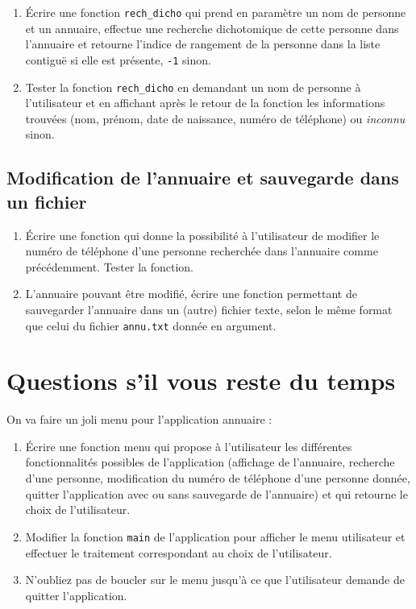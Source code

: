 \documentclass[final, pdftex, a4paper, openbib, ]{article}
\begin{document}
\begin{enumerate}
	\item Écrire une fonction \texttt{rech\_dicho} qui prend en paramètre un nom de personne et un annuaire, effectue une recherche dichotomique de cette personne dans l'annuaire
	et retourne l'indice de rangement de la personne dans la liste contiguë si elle est
	présente, \texttt{-1} sinon.
	\item Tester la fonction \texttt{rech\_dicho} en demandant un nom de personne à l'utilisateur et en affichant après le retour de la fonction les informations trouvées (nom, prénom, date de naissance, numéro de téléphone) ou \textit{inconnu} sinon.
\end{enumerate}

\subsection{Modification de l'annuaire et sauvegarde dans un fichier}

\begin{enumerate}
	\item Écrire une fonction qui donne la possibilité à l'utilisateur de modifier le numéro de téléphone d'une personne recherchée dans l'annuaire comme précédemment.
	Tester la fonction.
	\item L'annuaire pouvant être modifié, écrire une fonction permettant de sauvegarder l'annuaire dans un (autre) fichier texte, selon le même format que celui du fichier \texttt{annu.txt} donnée en argument.
\end{enumerate}


\section{Questions s’il vous reste du temps}

On va faire un joli menu pour l'application annuaire :

\begin{enumerate}
	\item Écrire une fonction menu qui propose à l'utilisateur les différentes fonctionnalités possibles de l'application (affichage de l'annuaire, recherche d'une personne, modification du numéro de téléphone d'une personne donnée, quitter l'application avec ou sans sauvegarde de l'annuaire) et qui retourne le choix de l'utilisateur.
	\item Modifier la fonction \texttt{main} de l'application pour afficher le menu utilisateur et effectuer le traitement correspondant au choix de l'utilisateur.
	\item N'oubliez pas de boucler sur le menu jusqu'à ce que l'utilisateur demande de quitter l'application.
\end{enumerate}
\end{document}
